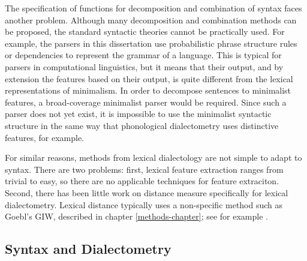 The specification of functions for decomposition and combination of
syntax faces another problem. Although many decomposition and
combination methods can be proposed, the standard syntactic theories
cannot be practically used. For example, the parsers in this
dissertation use probabilistic phrase structure rules or dependencies
to represent the grammar of a language. This is typical for parsers
in computational linguistics, but it means that their output, and by
extension the features based on their output, is quite different from
the lexical representations of minimalism. In order to decompose
sentences to minimalist features, a broad-coverage minimalist parser
would be required. Since such a parser does not yet exist, it is
impossible to use the minimalist syntactic structure in the same way that
phonological dialectometry uses distinctive features, for example.

For similar reasons, methods from lexical dialectology are not simple
to adapt to syntax. There are two problems: first, lexical feature
extraction ranges from trivial to easy, so there are no applicable
techniques for feature extraciton. Second, there has been little work
on distance measure specifically for lexical dialectometry. Lexical
distance typically uses a non-specific method such as Goebl's GIW,
described in chapter \ref{methods-chapter}; see for example
.


\subsection{Syntax and Dialectometry}

